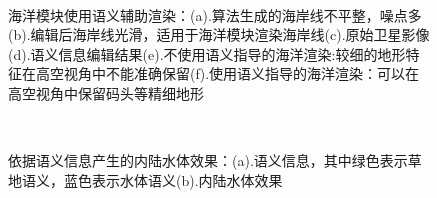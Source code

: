 \begin{figure}[H]
     \\
    \caption{海洋模块使用语义辅助渲染：(a).算法生成的海岸线不平整，噪点多(b).编辑后海岸线光滑，适用于海洋模块渲染海岸线(c).原始卫星影像(d).语义信息编辑结果(e).不使用语义指导的海洋渲染:较细的地形特征在高空视角中不能准确保留(f).使用语义指导的海洋渲染：可以在高空视角中保留码头等精细地形}
\end{figure}

\begin{figure}[H]
    \centering
    \\
    \caption{依据语义信息产生的内陆水体效果：(a).语义信息，其中绿色表示草地语义，蓝色表示水体语义(b).内陆水体效果}
\end{figure}

